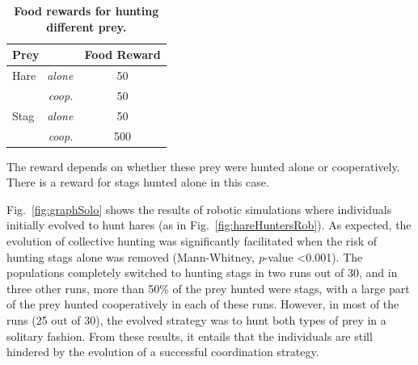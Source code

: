       \begin{table}[ht]
        \centering
          \caption{\textbf{Food rewards for hunting different prey.}}
          \begin{tabular}{|l|r|c|}
            \hline
            \multicolumn{2}{|l|}{\textbf{Prey}} & \textbf{Food Reward} \\
            \hline
            Hare & \textit{alone} & 50 \\
            \hline
            & \textit{coop.} & 50 \\
            \hline
            Stag & \textit{alone} & 50 \\
            \hline
            & \textit{coop.} & 500 \\
            \hline
          \end{tabular}
          \begin{flushleft} The reward depends on whether these prey were hunted alone or cooperatively. There is a reward for stags hunted alone in this case.
          \end{flushleft}
        \label{table:tableRewardsStagAlone}
      \end{table}

      Fig.~\ref{fig:graphSolo} shows the results of robotic simulations where individuals initially evolved to hunt hares (as in Fig.~\ref{fig:hareHuntersRob}). As expected, the evolution of collective hunting was significantly facilitated when the risk of hunting stags alone was removed (Mann-Whitney, {\em p}-value \textless 0.001). The populations completely switched to hunting stags in two runs out of 30, and in three other runs, more than 50\% of the prey hunted were stags, with a large part of the prey hunted cooperatively in each of these runs. However, in most of the runs (25 out of 30), the evolved strategy was to hunt both types of prey in a solitary fashion. From these results, it entails that the individuals are still hindered by the evolution of a successful coordination strategy.
      
